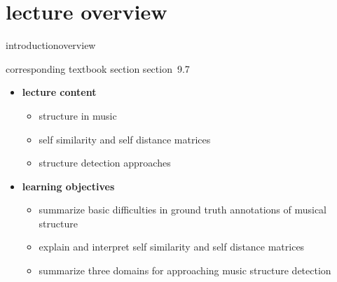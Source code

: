 


\subtitle{Module 9.7: Music Structure Detection}


	

    \section[overview]{lecture overview}
        \begin{frame}{introduction}{overview}
            \begin{block}{corresponding textbook section}
                    section~9.7
            \end{block}

            \begin{itemize}
                \item   \textbf{lecture content}
                    \begin{itemize}
                        \item   structure in music
                        \item   self similarity and self distance matrices
                        \item   structure detection approaches
                    \end{itemize}
                \bigskip
                \item<2->   \textbf{learning objectives}
                    \begin{itemize}
                        \item   summarize basic difficulties in ground truth annotations of musical structure
                        \item   explain and interpret self similarity and self distance matrices
                        \item   summarize three domains for approaching music structure detection
                    \end{itemize}
            \end{itemize}
        \end{frame}

